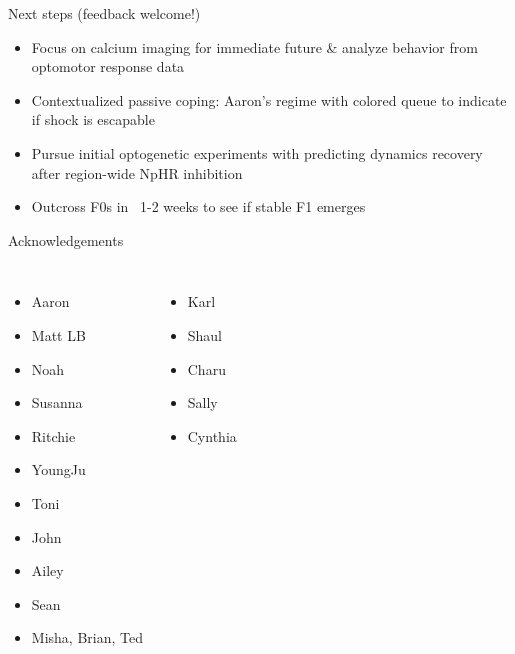 \begin{frame}{Next steps (feedback welcome!)}{}
	\centering
	\begin{itemize}
		\item Focus on calcium imaging for immediate future \& analyze behavior from optomotor response data
		\item Contextualized passive coping: Aaron's regime with colored queue to indicate if shock is escapable
		\item Pursue initial optogenetic experiments with predicting dynamics recovery after region-wide NpHR inhibition
		\item Outcross F0s in ~1-2 weeks to see if stable F1 emerges
	\end{itemize}
\end{frame}{}

\begin{frame}{Acknowledgements}{}
	\centering
	\begin{columns}[t]
			\begin{itemize}
				\item Aaron
				\item Matt LB
				\item Noah
				\item Susanna
				\item Ritchie
				\item YoungJu
				\item Toni
				\item John
				\item Ailey
				\item Sean
				\item Misha, Brian, Ted
			\end{itemize}
			\begin{itemize}
				\item Karl
				\item Shaul
				\item Charu
				\item Sally
				\item Cynthia
			\end{itemize}
  \end{columns}
\end{frame}{}
